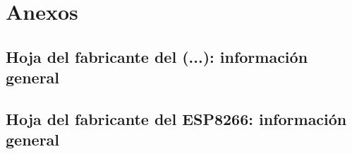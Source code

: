 \newpage
\section{Anexos}

\subsection{Hoja del fabricante del (...): información general} \label{an:01_GEN}
\vspace{\fill}
 

\subsection{Hoja del fabricante del ESP8266: información general} \label{an:02_GEN}
\vspace{\fill}
 
